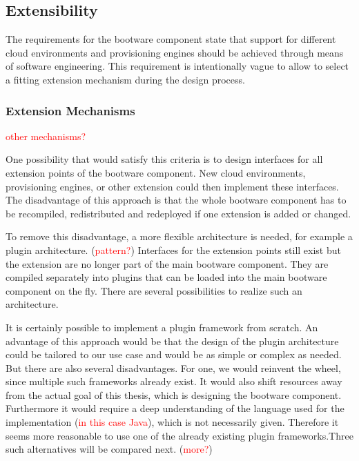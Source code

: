 \subsection{Extensibility}
\label{design:extensibility}

The requirements for the bootware component state that support for different cloud environments and provisioning engines should be achieved through means of software engineering.
This requirement is intentionally vague to allow to select a fitting extension mechanism during the design process.

\subsubsection{Extension Mechanisms}

\textcolor{red}{other mechanisms?}

One possibility that would satisfy this criteria is to design interfaces for all extension points of the bootware component.
New cloud environments, provisioning engines, or other extension could then implement these interfaces.
The disadvantage of this approach is that the whole bootware component has to be recompiled, redistributed and redeployed if one extension is added or changed.

To remove this disadvantage, a more flexible architecture is needed, for example a plugin architecture. (\textcolor{red}{pattern?})
Interfaces for the extension points still exist but the extension are no longer part of the main bootware component.
They are compiled separately into plugins that can be loaded into the main bootware component on the fly.
There are several possibilities to realize such an architecture.

It is certainly possible to implement a plugin framework from scratch.
An advantage of this approach would be that the design of the plugin architecture could be tailored to our use case and would be as simple or complex as needed.
But there are also several disadvantages.
For one, we would reinvent the wheel, since multiple such frameworks already exist.
It would also shift resources away from the actual goal of this thesis, which is designing the bootware component.
Furthermore it would require a deep understanding of the language used for the implementation (\textcolor{red}{in this case Java}), which is not necessarily given.
Therefore it seems more reasonable to use one of the already existing plugin frameworks.Three such alternatives will be compared next. (\textcolor{red}{more?})


